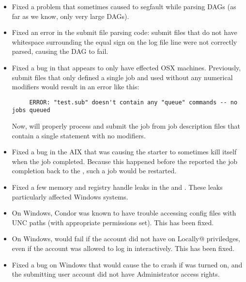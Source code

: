 \begin{itemize}

\item Fixed a problem that sometimes caused  to segfault while
      parsing DAGs (as far as we know, only very large DAGs).

\item Fixed an error in the  submit file parsing code:
      submit files that do not have whitespace surrounding the equal sign
      on the log file line were not correctly parsed, causing the DAG
      to fail.

\item Fixed a bug in  that appears to only have
  effected OSX machines.
  Previously, submit files that only defined a single job and used
  \verb@queue@ without any numerical modifiers would result in an
  error like this: 
\footnotesize
\begin{verbatim}
     ERROR: "test.sub" doesn't contain any "queue" commands -- no jobs queued
\end{verbatim}
\normalsize
  Now,  will properly process and submit the job from
  job description files that contain a single \verb@queue@ statement
  with no modifiers.

\item Fixed a bug in the AIX  that was causing the
starter to sometimes kill itself when the job completed.  Because this
happened before the  reported the job completion back
to the , such a job would be restarted.

\item Fixed a few memory and registry handle leaks in the 
and . These leaks particularly affected Windows systems.

\item On Windows, Condor was known to have trouble accessing config files
with UNC paths (with appropriate permissions set). This has been fixed.

\item On Windows,  would fail if the account did not
have \verb@Log on Locally@ priviledges, even if the account was allowed
to log in interactively. This has been fixed.

\item Fixed a bug on Windows that would cause the  to
crash if  was turned on, and the submitting user
account did not have Administrator access rights.

\end{itemize}

